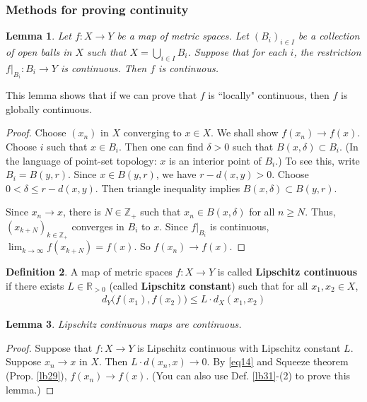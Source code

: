 \documentclass[12pt,b5paper,notitlepage]{article}
\theoremstyle{definition}
\newtheorem{df}{Definition}[section]
\theoremstyle{plain}
\newtheorem{lm}[df]{Lemma}
\newcommand{\Zbb}{\mathbb Z}
\newcommand{\Rbb}{\mathbb R}
\numberwithin{equation}{section}
\begin{document}
\subsubsection{Methods for proving continuity}


\begin{lm}\label{lb30}
Let $f:X\rightarrow Y$ be a map of metric spaces.  Let $(B_i)_{i\in I}$ be a collection of open balls in $X$ such that $X=\bigcup_{i\in I}B_i$. Suppose that for each $i$, the restriction $f|_{B_i}:B_i\rightarrow Y$ is continuous. Then $f$ is continuous. 
\end{lm}

This lemma shows that if we can prove that $f$ is ``locally" continuous, then $f$ is globally continuous. 

\begin{proof}
Choose $(x_n)$ in $X$ converging to $x\in X$. We shall show $f(x_n)\rightarrow f(x)$. Choose $i$ such that $x\in B_i$. Then one can find $\delta>0$ such that $B(x,\delta)\subset B_i$. (In the language of point-set topology: $x$ is an interior point of $B_i$.) To see this, write $B_i=B(y,r)$. Since $x\in B(y,r)$, we have $r-d(x,y)>0$. Choose $0<\delta\leq r-d(x,y)$. Then triangle inequality implies $B(x,\delta)\subset B(y,r)$. 

Since $x_n\rightarrow x$, there is $N\in\Zbb_+$ such that $x_n\in B(x,\delta)$ for all $n\geq N$. Thus, $(x_{k+N})_{k\in\Zbb_+}$ converges in $B_i$ to $x$. Since $f|_{B_i}$ is continuous, $\lim_{k\rightarrow\infty} f(x_{k+N})=f(x)$. So $f(x_n)\rightarrow f(x)$.
\end{proof}







\begin{df}
A map of metric spaces $f:X\rightarrow Y$ is called  \textbf{Lipschitz continuous} if there exists $L\in\Rbb_{>0}$ (called \textbf{Lipschitz constant})  such that for all $x_1,x_2\in X$,
\begin{align}
d_Y\big(f(x_1),f(x_2) \big)\leq L\cdot d_X(x_1,x_2) \label{eq14}
\end{align}
\end{df}

\begin{lm}\label{lb34}
Lipschitz continuous maps are continuous. 
\end{lm}

\begin{proof}
Suppose that $f:X\rightarrow Y$ is Lipschitz continuous with Lipschitz constant $L$. Suppose $x_n\rightarrow x$ in $X$. Then $L\cdot d(x_n,x)\rightarrow 0$. By \eqref{eq14} and Squeeze theorem (Prop. \ref{lb29}), $f(x_n)\rightarrow f(x)$. (You can also use Def. \ref{lb31}-(2) to prove this lemma.)
\end{proof}
\end{document}
